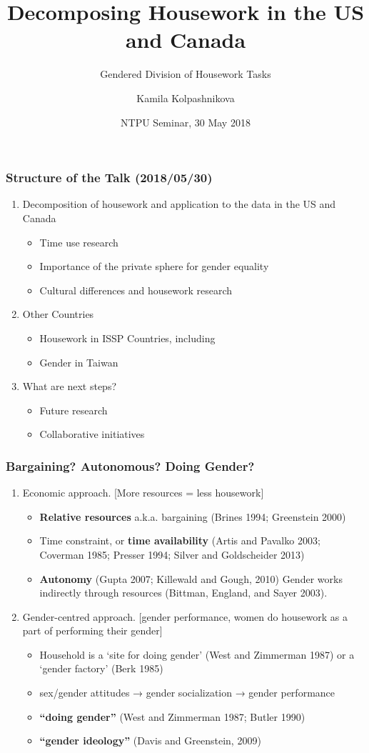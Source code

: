 \documentclass{beamer}
\title[Housework Research] %
{Decomposing Housework in the US and Canada}
\subtitle{Gendered Division of Housework Tasks}
\author[Kolpashnikova, Kamila] %
{Kamila Kolpashnikova\inst{1}}
\institute[NTPU] %
{
  \inst{1}%
  Visiting Scholar\\
  Department of Sociology\\
  National Taipei University  
}
\date[Seminar 2018] %
{NTPU Seminar, 30 May 2018}
\begin{document}
 
\frame{\titlepage}
 
\begin{frame}
\frametitle{Structure of the Talk (2018/05/30)}
  \begin{enumerate}
  	\item  Decomposition of housework and application to the data in the US and Canada 
  	\begin{itemize}
  	\item Time use research
  	\item Importance of the private sphere for gender equality
  	\item Cultural differences and housework research
  	\end{itemize}
  \item Other Countries
    \begin{itemize}
  	\item Housework in ISSP Countries, including
  	\item Gender in Taiwan
  	\end{itemize}
  \item  What are next steps?
  	\begin{itemize}
  	\item Future research
  	\item Collaborative initiatives
  	\end{itemize}
  \end{enumerate}
\end{frame}

\begin{frame}
\frametitle{Bargaining? Autonomous? Doing Gender?}
  \begin{enumerate}
  	\item  Economic approach. [More resources = less housework] 
  	\begin{itemize}
  	\item \textbf{Relative resources} a.k.a. bargaining (Brines 1994; Greenstein 2000)
  	\item Time constraint, or \textbf{time availability} (Artis and Pavalko 2003; Coverman 1985; Presser 1994; Silver and Goldscheider 2013)
  	\item \textbf{Autonomy} (Gupta 2007; Killewald and Gough, 2010)
Gender works indirectly through resources (Bittman, England, and Sayer 2003).
  	\end{itemize}
  \item Gender-centred approach. [gender performance, women do housework as a part of performing their gender]
    \begin{itemize}
  	\item Household is a ‘site for doing gender’ (West and Zimmerman 1987) or a ‘gender factory’ (Berk 1985)
  	\item sex/gender attitudes → gender socialization → gender performance
  	\item  \textbf{“doing gender”} (West and Zimmerman 1987; Butler 1990)
  	\item \textbf{“gender ideology”} (Davis and Greenstein, 2009)
  	\end{itemize}
  \end{enumerate}
\end{frame}
\end{document}
